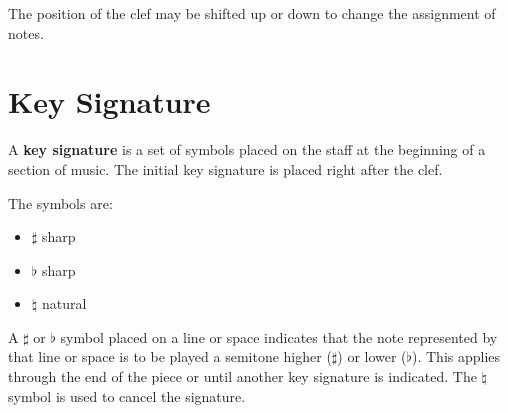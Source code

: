 \documentclass{article}
\begin{document}
\begin{center}
\end{center}

The position of the clef may be shifted up or down to change the assignment of notes.

\section{Key Signature}

A \textbf{key signature} is a set of symbols placed
on the staff at the beginning of a section of music.
The initial key signature is placed right after the clef.

The symbols are:

\begin{itemize}
    \item \(\sharp\) sharp
    \item \(\flat\) sharp
    \item \(\natural\) natural
\end{itemize}

A \(\sharp\) or \(\flat\) symbol placed on a line or space
indicates that the note represented by that line or space is to be played
a semitone higher (\(\sharp\)) or lower (\(\flat\)).
This applies through the end of the piece or until another key signature is indicated.
The \(\natural\) symbol is used to cancel the signature.
\end{document}

